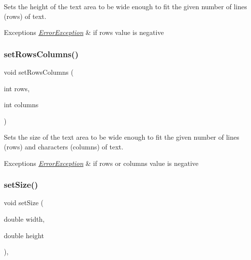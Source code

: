 Sets the height of the text area to be wide enough to fit the given number of lines (rows) of text. 


\begin{DoxyExceptions}{Exceptions}
{\em \mbox{\hyperlink{classErrorException}{Error\+Exception}}} & if rows value is negative \\
\hline
\end{DoxyExceptions}
\mbox{\label{classGTextArea_a15142a18598662167760b35e58be90b1}} 
\subsubsection{\texorpdfstring{set\+Rows\+Columns()}{setRowsColumns()}}
{\footnotesize\ttfamily void set\+Rows\+Columns (\begin{DoxyParamCaption}\item[{int}]{rows,  }\item[{int}]{columns }\end{DoxyParamCaption})\hspace{0.3cm}{\ttfamily [virtual]}}



Sets the size of the text area to be wide enough to fit the given number of lines (rows) and characters (columns) of text. 


\begin{DoxyExceptions}{Exceptions}
{\em \mbox{\hyperlink{classErrorException}{Error\+Exception}}} & if rows or columns value is negative \\
\hline
\end{DoxyExceptions}
\mbox{\label{classGInteractor_aca25d49481f9bf5fc8f7df4c086c4ce7}} 
\subsubsection{\texorpdfstring{set\+Size()}{setSize()}\hspace{0.1cm}{\footnotesize\ttfamily [1/2]}}
{\footnotesize\ttfamily void set\+Size (\begin{DoxyParamCaption}\item[{double}]{width,  }\item[{double}]{height }\end{DoxyParamCaption})\hspace{0.3cm}{\ttfamily [virtual]}, {\ttfamily [inherited]}}



